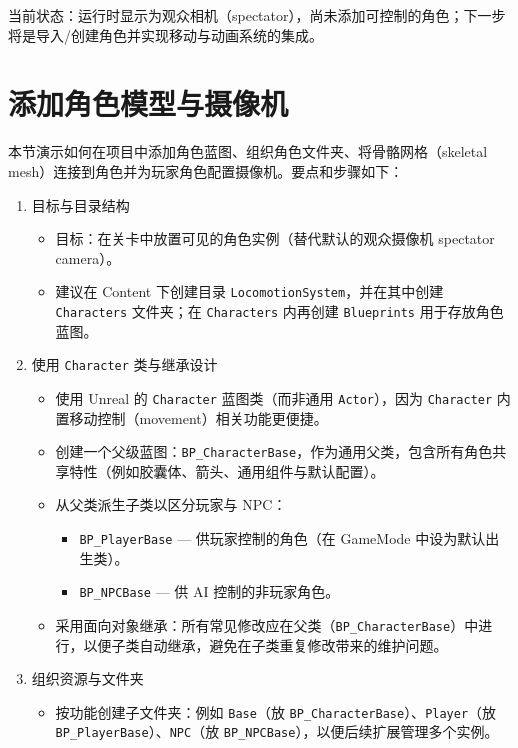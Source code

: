 \documentclass[10pt,CJKmath]{zhbook-v1}
\newcommand{\il}[1]{\texttt{#1}}%
\begin{document}
当前状态：运行时显示为观众相机（spectator），尚未添加可控制的角色；下一步将是导入/创建角色并实现移动与动画系统的集成。

\section{添加角色模型与摄像机}

本节演示如何在项目中添加角色蓝图、组织角色文件夹、将骨骼网格（skeletal mesh）连接到角色并为玩家角色配置摄像机。要点和步骤如下：

\begin{enumerate}
  \item 目标与目录结构
    \begin{itemize}
      \item 目标：在关卡中放置可见的角色实例（替代默认的观众摄像机 spectator camera）。
      \item 建议在 Content 下创建目录 \il{LocomotionSystem}，并在其中创建 \il{Characters} 文件夹；在 \il{Characters} 内再创建 \il{Blueprints} 用于存放角色蓝图。
    \end{itemize}

  \item 使用 \il{Character} 类与继承设计
    \begin{itemize}
      \item 使用 Unreal 的 \il{Character} 蓝图类（而非通用 \il{Actor}），因为 \il{Character} 内置移动控制（movement）相关功能更便捷。
      \item 创建一个父级蓝图：\il{BP_CharacterBase}，作为通用父类，包含所有角色共享特性（例如胶囊体、箭头、通用组件与默认配置）。
      \item 从父类派生子类以区分玩家与 NPC：
        \begin{itemize}
          \item \il{BP_PlayerBase} — 供玩家控制的角色（在 GameMode 中设为默认出生类）。
          \item \il{BP_NPCBase} — 供 AI 控制的非玩家角色。
        \end{itemize}
      \item 采用面向对象继承：所有常见修改应在父类（\il{BP_CharacterBase}）中进行，以便子类自动继承，避免在子类重复修改带来的维护问题。
    \end{itemize}

  \item 组织资源与文件夹
    \begin{itemize}
      \item 按功能创建子文件夹：例如 \il{Base}（放 \il{BP_CharacterBase}）、\il{Player}（放 \il{BP_PlayerBase}）、\il{NPC}（放 \il{BP_NPCBase}），以便后续扩展管理多个实例。
    \end{itemize}


\end{enumerate}
\end{document}
